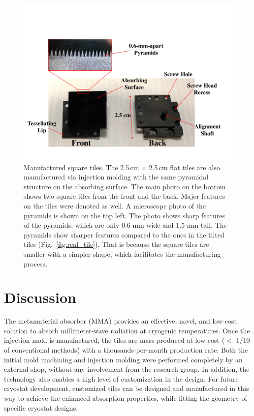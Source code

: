 \begin{figure}[t]
    \centering
    \includegraphics[width=\textwidth]{Figures/square_tiles.pdf}
    \caption{Manufactured square tiles. The 2.5\,cm $\times$ 2.5\,cm flat tiles are also manufactured via injection molding with the same pyramidal structure on the absorbing surface. The main photo on the bottom shows two square tiles from the front and the back. Major features on the tiles were denoted as well. A microscope photo of the pyramids is shown on the top left. The photo shows sharp features of the pyramids, which are only 0.6-mm wide and 1.5-mm tall. The pyramids show sharper features compared to the ones in the tilted tiles (Fig.~\ref{fig:real_tile}). That is because the square tiles are smaller with a simpler shape, which facilitates the manufacturing process.}
    \label{fig:square_tiles}
\end{figure}

\section{Discussion}
\label{sec:conclusion}

The metamaterial absorber (MMA) provides an effective, novel, and low-cost solution to absorb millimeter-wave radiation at cryogenic temperatures. Once the injection mold is manufactured, the tiles are mass-produced at low cost ($<$ 1/10 of conventional methods) with a thousands-per-month production rate. Both the initial mold machining and injection molding were performed completely by an external shop, without any involvement from the research group. In addition, the technology also enables a high level of customization in the design. For future cryostat development, customized tiles can be designed and manufactured in this way to achieve the enhanced absorption properties, while fitting the geometry of specific cryostat designs.



